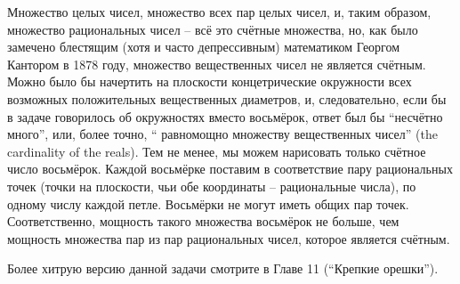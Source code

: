 Множество целых чисел, множество всех пар целых чисел, и, таким образом, множество рациональных чисел -- всё это счётные множества, но, как было замечено блестящим (хотя и часто депрессивным) математиком Георгом Кантором в 1878 году, множество вещественных чисел не является счётным.
Можно было бы начертить на плоскости концетрические окружности всех возможных положительных вещественных диаметров, и, следовательно, если бы в задаче говорилось об окружностях вместо восьмёрок, ответ был бы “несчётно много”, или, более точно, “ равномощно множеству вещественных чисел” (the cardinality of the reals).
Тем не менее, мы можем нарисовать только счётное число восьмёрок.
Каждой восьмёрке поставим в соответствие пару рациональных точек (точки на плоскости, чьи обе координаты -- рациональные числа), по одному числу каждой петле.
Восьмёрки не могут иметь общих пар точек.
Соответственно, мощность такого множества восьмёрок не больше, чем мощность множества пар из пар рациональных чисел, которое является счётным.

Более хитрую версию данной задачи смотрите в Главе 11 (“Крепкие орешки”).
